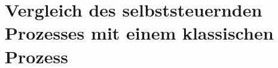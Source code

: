 \section{Vergleich des selbststeuernden Prozesses mit einem klassischen
Prozess}
\label{Vergleich}



